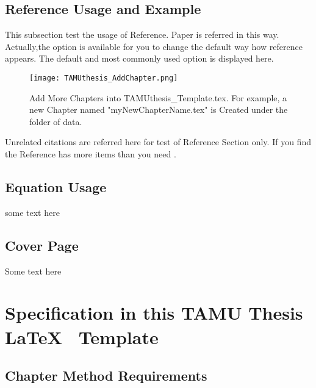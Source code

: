 \subsection{Reference Usage and Example}

This subsection test the usage of Reference. Paper \citet{McLoughlin:2014:SVA:2687082.2687090} 
is referred in this way. Actually,the option is available for you to change the default way how reference appears. The default and most commonly used option \cite{einstein} is displayed here.

\begin{figure}[ht]

\centering
\texttt{[image: TAMUthesis\_AddChapter.png]}
\caption[Add More Chapters into TAMUthesis\_Template.tex]{Add More Chapters into TAMUthesis\_Template.tex. For example, a new Chapter named "myNewChapterName.tex" is Created under the
folder of data.}



\label{fig:addMoreChapters}

\end{figure}


 


Unrelated citations are referred here for test of Reference Section only\cite{Andraka:1998:SCA:275107.275139}. If you
find the Reference \cite{Barrera:2013:APC:2482767.2482778} has more items than you need \cite{beritelli2002performance}.

\subsection{Equation Usage}

some text here

\subsection{Cover Page}

Some text here

\section{Specification in this TAMU Thesis \LaTeX ~ Template}

\subsection{Chapter Method Requirements}
 
